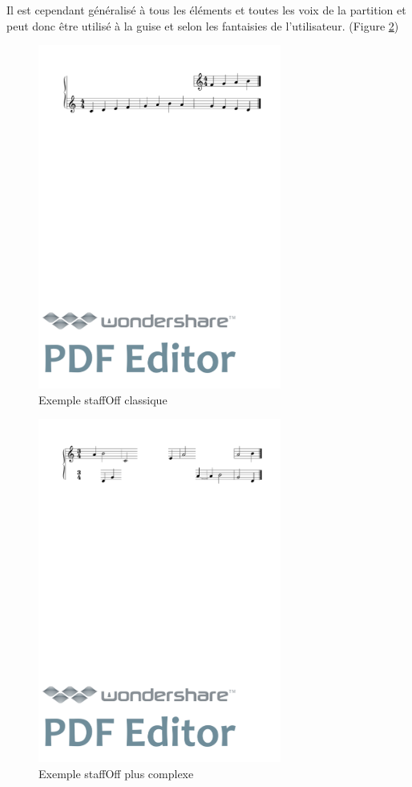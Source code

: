 \documentclass[a4paper,10pt,twocolumn]{article}
\begin{document}
Il est cependant généralisé à tous les éléments et toutes les voix de la partition et peut donc être utilisé à la guise et selon les fantaisies de l'utilisateur. (Figure \ref{fig:staffoffexotique})

\begin{figure}[h]
\centering
\includegraphics[width=8cm]{img/staffoff.pdf}
\caption{ Exemple staffOff classique}
\label{fig:staffoffsimple}
\end{figure}


\begin{figure}[h]
\centering
\includegraphics[width=8cm]{img/staffoffexotique.pdf}
\caption{ Exemple staffOff plus complexe}
\label{fig:staffoffexotique}
\end{figure}
\end{document}
